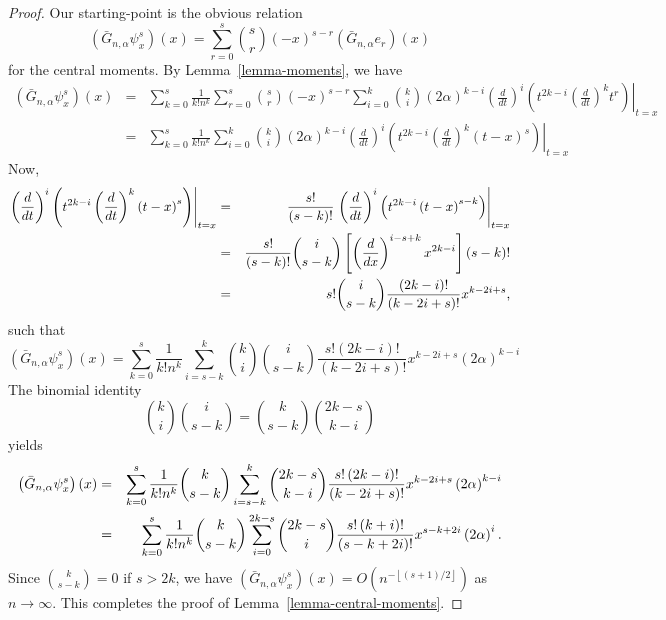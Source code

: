 \documentclass[10pt,a4paper]{amsart}
\begin{document}
\begin{proof}
Our starting-point is the obvious relation 
\begin{equation*}
\left( \bar{G}_{n,\alpha }\psi _{x}^{s}\right) \left( x\right)
=\sum_{r=0}^{s}\binom{s}{r}\left( -x\right) ^{s-r}\left( \bar{G}_{n,\alpha
}e_{r}\right) \left( x\right)
\end{equation*}%
for the central moments. By Lemma~\ref{lemma-moments}, we have\ 
\begin{eqnarray*}
\left( \bar{G}_{n,\alpha }\psi _{x}^{s}\right) \left( x\right)
&=&\sum_{k=0}^{s}\frac{1}{k!n^{k}}\sum_{r=0}^{s}\binom{s}{r}\left( -x\right)
^{s-r}\sum_{i=0}^{k}\binom{k}{i}\left( 2\alpha \right) ^{k-i}\left. \left( 
\frac{d}{dt}\right) ^{i}\left( t^{2k-i}\left( \frac{d}{dt}\right)
^{k}t^{r}\right) \right\vert _{t=x} \\
&=&\sum_{k=0}^{s}\frac{1}{k!n^{k}}\sum_{i=0}^{k}\binom{k}{i}\left( 2\alpha
\right) ^{k-i}\left. \left( \frac{d}{dt}\right) ^{i}\left( t^{2k-i}\left( 
\frac{d}{dt}\right) ^{k}\left( t-x\right) ^{s}\right) \right\vert _{t=x}
\end{eqnarray*}%
Now, 
\begin{eqnarray*}
\left. \left( \frac{d}{dt}\right) ^{i}\left( t^{2k-i}\left( \frac{d}{dt}%
\right) ^{k}\left( t-x\right) ^{s}\right) \right\vert _{t=x} &=&\frac{s!}{%
\left( s-k\right) !}\left. \left( \frac{d}{dt}\right) ^{i}\left(
t^{2k-i}\left( t-x\right) ^{s-k}\right) \right\vert _{t=x} \\
&=&\frac{s!}{\left( s-k\right) !}\binom{i}{s-k}\left[ \left( \frac{d}{dx}%
\right) ^{i-s+k}x^{2k-i}\right] \left( s-k\right) ! \\
&=&s!\binom{i}{s-k}\frac{\left( 2k-i\right) !}{\left( k-2i+s\right) !}%
x^{k-2i+s},
\end{eqnarray*}%
such that 
\begin{equation*}
\left( \bar{G}_{n,\alpha }\psi _{x}^{s}\right) \left( x\right)
=\sum_{k=0}^{s}\frac{1}{k!n^{k}}\sum_{i=s-k}^{k}\binom{k}{i}\binom{i}{s-k}%
\frac{s!\left( 2k-i\right) !}{\left( k-2i+s\right) !}x^{k-2i+s}\left(
2\alpha \right) ^{k-i}
\end{equation*}%
The binomial identity 
\begin{equation*}
\binom{k}{i}\binom{i}{s-k}=\binom{k}{s-k}\binom{2k-s}{k-i}
\end{equation*}%
yields 
\begin{eqnarray*}
\left( \bar{G}_{n,\alpha }\psi _{x}^{s}\right) \left( x\right)
&=&\sum_{k=0}^{s}\frac{1}{k!n^{k}}\binom{k}{s-k}\sum_{i=s-k}^{k}\binom{2k-s}{%
k-i}\frac{s!\left( 2k-i\right) !}{\left( k-2i+s\right) !}x^{k-2i+s}\left(
2\alpha \right) ^{k-i} \\
&=&\sum_{k=0}^{s}\frac{1}{k!n^{k}}\binom{k}{s-k}\sum_{i=0}^{2k-s}\binom{2k-s%
}{i}\frac{s!\left( k+i\right) !}{\left( s-k+2i\right) !}x^{s-k+2i}\left(
2\alpha \right) ^{i}.
\end{eqnarray*}%
Since $\binom{k}{s-k}=0$ if $s>2k$, we have $\left( \bar{G}_{n,\alpha }\psi
_{x}^{s}\right) \left( x\right) =O\left( n^{-\left\lfloor \left( s+1\right)
/2\right\rfloor }\right) $ as $n\rightarrow \infty $. This completes the
proof of Lemma~\ref{lemma-central-moments}.
\end{proof}
\end{document}
